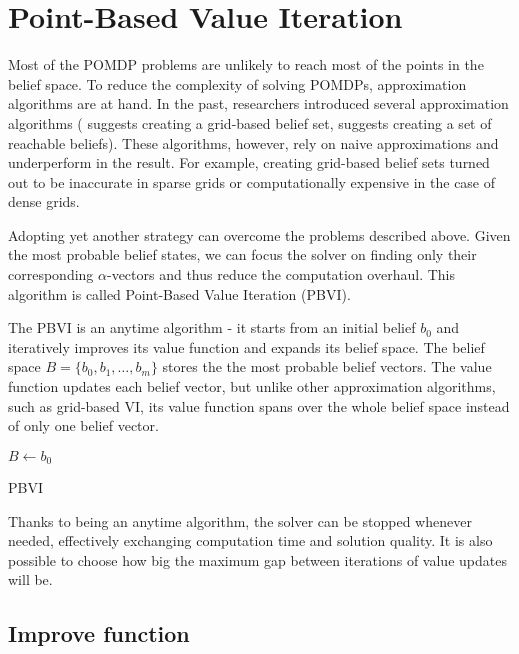 \section{Point-Based Value Iteration}

Most of the POMDP problems are unlikely to reach most of the points in the belief space. To reduce the complexity of solving POMDPs, approximation algorithms are at hand. In the past, researchers introduced several approximation algorithms (\cite{10.2307/171496} suggests creating a grid-based belief set, \cite{Hauskrecht00} suggests creating a set of reachable beliefs). These algorithms, however, rely on naive approximations and underperform in the result. For example, creating grid-based belief sets turned out to be inaccurate in sparse grids or computationally expensive in the case of dense grids.

Adopting yet another strategy can overcome the problems described above. Given the most probable belief states, we can focus the solver on finding only their corresponding $\alpha$-vectors and thus reduce the computation overhaul. This algorithm is called Point-Based Value Iteration (PBVI).

The PBVI \cite{pbvi} is an anytime algorithm - it starts from an initial belief $b_0$ and iteratively improves its value function and expands its belief space. The belief space $B = \{b_0, b_1, \ldots, b_m\}$ stores the the most probable belief vectors. The value function updates each belief vector, but unlike other approximation algorithms, such as grid-based VI, its value function spans over the whole belief space instead of only one belief vector.

\LinesNumbered
\begin{algorithm}[H]
\SetAlgoLined
$B \xleftarrow{} {b_0}$\\
\caption{PBVI}
\end{algorithm}

Thanks to being an anytime algorithm, the solver can be stopped whenever needed, effectively exchanging computation time and solution quality. It is also possible to choose how big the maximum gap between iterations of value updates will be.


\subsection{Improve function}

